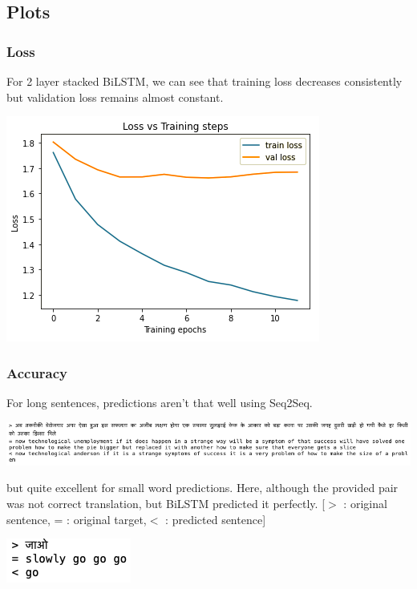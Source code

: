 \documentclass[11pt, oneside]{article}   	%
\begin{document}
\subsection{Plots}
\subsubsection{Loss}
For 2 layer stacked BiLSTM, we can see that training loss decreases consistently but validation loss remains almost constant.
\begin{center}
\includegraphics[scale=0.6]{Loss512LSTM.png}
\end{center}

\subsubsection{Accuracy}
For long sentences, predictions aren't that well using Seq2Seq.
\begin{center}
\includegraphics[scale=0.6]{long}
\end{center}
but quite excellent for small word predictions. Here, although the provided pair was not correct translation, but BiLSTM predicted it perfectly.  [$>$ : original sentence, = : original target,$ <$ : predicted sentence]
\begin{center}
\includegraphics[scale=0.6]{small}
\end{center}
\end{document}
